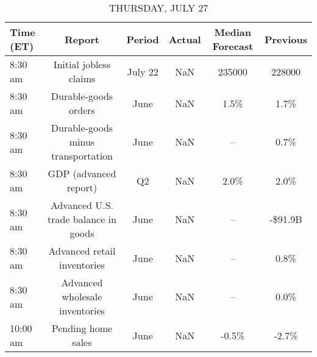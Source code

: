 \documentclass{article}%
\begin{document}
%


\begin{table}[htbp]%
\caption{THURSDAY, JULY 27}%
\centering%
\begin{adjustbox}{width=1\textwidth}%
\begin{tabular}{lccccc}
\toprule
Time (ET) &                               Report &  Period & Actual & Median Forecast & Previous \\
\midrule
  8:30 am &               Initial jobless claims & July 22 &    NaN &          235000 &   228000 \\
  8:30 am &                 Durable-goods orders &    June &    NaN &            1.5\% &     1.7\% \\
  8:30 am &   Durable-goods minus transportation &    June &    NaN &              -- &     0.7\% \\
  8:30 am &                GDP (advanced report) &      Q2 &    NaN &            2.0\% &     2.0\% \\
  8:30 am & Advanced U.S. trade balance in goods &    June &    NaN &              -- &  -\$91.9B \\
  8:30 am &          Advanced retail inventories &    June &    NaN &              -- &     0.8\% \\
  8:30 am &       Advanced wholesale inventories &    June &    NaN &              -- &     0.0\% \\
 10:00 am &                   Pending home sales &    June &    NaN &           -0.5\% &    -2.7\% \\
\bottomrule
\end{tabular}
%
\end{adjustbox}%
\end{table}

%
\end{document}
